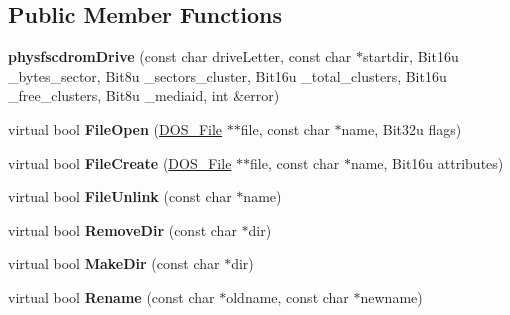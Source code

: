 \subsection*{Public Member Functions}
\begin{DoxyCompactItemize}
\item 
\hypertarget{classphysfscdromDrive_a7c14f3179c62694f413b6214ba030891}{{\bfseries physfscdrom\-Drive} (const char drive\-Letter, const char $\ast$startdir, Bit16u \-\_\-bytes\-\_\-sector, Bit8u \-\_\-sectors\-\_\-cluster, Bit16u \-\_\-total\-\_\-clusters, Bit16u \-\_\-free\-\_\-clusters, Bit8u \-\_\-mediaid, int \&error)}\label{classphysfscdromDrive_a7c14f3179c62694f413b6214ba030891}

\item 
\hypertarget{classphysfscdromDrive_a61f1d0f470cb2965f711373a305eb647}{virtual bool {\bfseries File\-Open} (\hyperlink{classDOS__File}{D\-O\-S\-\_\-\-File} $\ast$$\ast$file, const char $\ast$name, Bit32u flags)}\label{classphysfscdromDrive_a61f1d0f470cb2965f711373a305eb647}

\item 
\hypertarget{classphysfscdromDrive_aca5f8e76f50962735d5d2f6d8a0b04c5}{virtual bool {\bfseries File\-Create} (\hyperlink{classDOS__File}{D\-O\-S\-\_\-\-File} $\ast$$\ast$file, const char $\ast$name, Bit16u attributes)}\label{classphysfscdromDrive_aca5f8e76f50962735d5d2f6d8a0b04c5}

\item 
\hypertarget{classphysfscdromDrive_ae9c8c3ef8a45c7657809d26c0a338c6c}{virtual bool {\bfseries File\-Unlink} (const char $\ast$name)}\label{classphysfscdromDrive_ae9c8c3ef8a45c7657809d26c0a338c6c}

\item 
\hypertarget{classphysfscdromDrive_a39276f5246bbf020dff77982a18e786e}{virtual bool {\bfseries Remove\-Dir} (const char $\ast$dir)}\label{classphysfscdromDrive_a39276f5246bbf020dff77982a18e786e}

\item 
\hypertarget{classphysfscdromDrive_a40da3c72e6957f94ca3377104ccbfae9}{virtual bool {\bfseries Make\-Dir} (const char $\ast$dir)}\label{classphysfscdromDrive_a40da3c72e6957f94ca3377104ccbfae9}

\item 
\hypertarget{classphysfscdromDrive_a83630223d8b47c3908e9ff9040974dd1}{virtual bool {\bfseries Rename} (const char $\ast$oldname, const char $\ast$newname)}\label{classphysfscdromDrive_a83630223d8b47c3908e9ff9040974dd1}


\end{DoxyCompactItemize}
